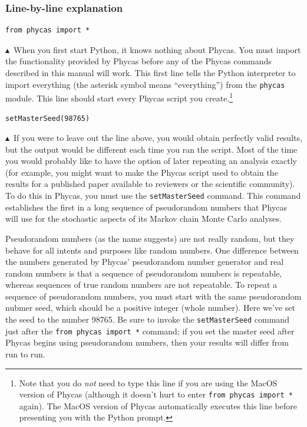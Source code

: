 \documentclass[10pt]{article}
\newcommand{\code}[1]{{\tt #1}}					%
\newcommand{\cmd}[1]{{\tt \small #1}\index{#1}}	%
\newcommand{\pointup}{$\blacktriangle$}
\begin{document}
\subsubsection{Line-by-line explanation} 
\label{subsubsec:basicpyexplanation}
\begin{samepage}
\begin{verbatim}
from phycas import *
\end{verbatim}
\pointup\ When you first start Python, it knows nothing about Phycas. You must import the functionality provided by Phycas before any of the Phycas commands described in this manual will work. This first line tells the Python interpreter to import everything (the asterisk symbol means ``everything'') from the \code{phycas} module. This line should start every Phycas script you create.\footnote{Note that you do {\em not} need to type this line if you are using the MacOS version of Phycas (although it doesn't hurt to enter \code{from phycas import *} again). The MacOS version of Phycas automatically executes this line before presenting you with the Python prompt.}

\end{samepage}
\begin{samepage}
\begin{verbatim}
setMasterSeed(98765)
\end{verbatim}
\pointup\ If you were to leave out the line above, you would obtain perfectly valid results, but the output would be different each time you ran the script. Most of the time you would probably like to have the option of later repeating an analysis exactly (for example, you might want to make the Phycas script used to obtain the results for a published paper available to reviewers or the scientific community). To do this in Phycas, you must use the \cmd{setMasterSeed} command. This command establishes the first in a long sequence of pseudorandom numbers that Phycas will use for the stochastic aspects of its Markov chain Monte Carlo analyses.

Pseudorandom numbers (as the name suggests) are not really random, but they behave for all intents and purposes like random numbers. One difference between the numbers generated by Phycas' pseudorandom number generator and real random numbers is that a sequence of pseudorandom numbers is repeatable, whereas sequences of true random numbers are not repeatable. To repeat a sequence of pseudorandom numbers, you must start with the same pseudorandom nubmer seed, which should be a positive integer (whole number). Here we've set the seed to the number 98765. Be sure to invoke the \cmd{setMasterSeed} command just after the \cmd{from phycas import *} command; if you set the master seed after Phycas begins using pseudorandom numbers, then your results will differ from run to run.
\end{samepage}
\end{document}
